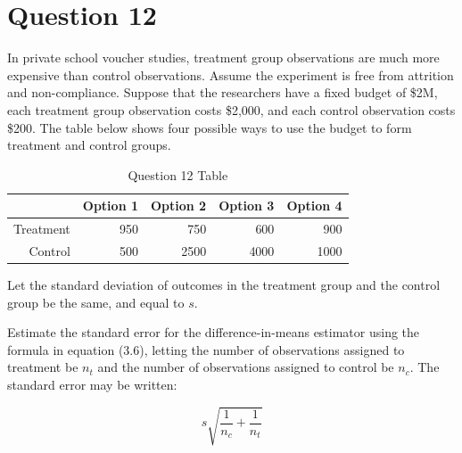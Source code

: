 \documentclass[11pt,notitlepage]{article}\usepackage[]{graphicx}\usepackage[]{color}
\begin{document}
\section*{Question 12}
In private school voucher studies, treatment group observations are much more expensive than control observations. Assume the experiment is free from attrition and non-compliance. Suppose that the researchers have a fixed budget of \$2M, each treatment group observation costs \$2,000, and each control observation costs \$200. The table below shows four possible ways to use the budget to form treatment and control groups.
\begin{table}[htbp]
  \centering
  \caption{Question 12 Table}
    \begin{tabular}{rrrrr}
    \toprule
          & Option 1  & Option 2  & Option 3  & Option 4  \\
    \midrule
    Treatment  & 950   & 750   & 600   & 900 \\
    Control  & 500   & 2500  & 4000  & 1000 \\
    \bottomrule
    \end{tabular}%
  \label{tab:addlabel}%
\end{table}%
Let the standard deviation of outcomes in the treatment group and the control group be the same, and equal to $s$.

Estimate the standard error for the difference-in-means estimator using the formula in equation (3.6), letting the number of observations assigned to treatment be $n_t$ and the number of observations assigned to control be $n_c$. The standard error may be written:

\begin{equation*}
s \sqrt{\frac{1}{n_c} + \frac{1}{n_t}}
\end{equation*}
\end{document}
